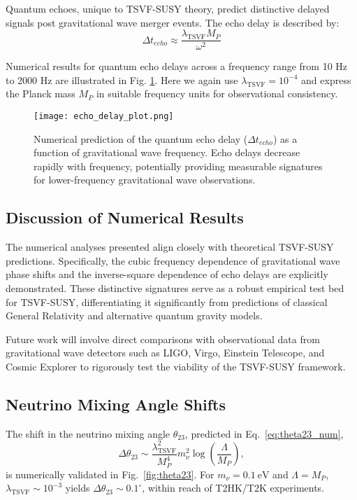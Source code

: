 \documentclass[12pt, onecolumn]{article}
\theoremstyle{definition}
\newcommand{\tsvf}{\lambda_{\mathrm{TSVF}}}
\numberwithin{equation}{section}
\begin{document}
Quantum echoes, unique to TSVF-SUSY theory, predict distinctive delayed signals post gravitational wave merger events. The echo delay is described by:
\begin{equation}\label{eq:echo_delay}
\Delta t_{echo} \approx \frac{\lambda_{\text{TSVF}} M_P}{\omega^2}
\end{equation}

Numerical results for quantum echo delays across a frequency range from 10 Hz to 2000 Hz are illustrated in Fig. \ref{fig:echo_delay}. Here we again use $\lambda_{\text{TSVF}} = 10^{-4}$ and express the Planck mass $M_P$ in suitable frequency units for observational consistency.

\begin{figure}[htbp]
\centering
\texttt{[image: echo\_delay\_plot.png]}
\caption{Numerical prediction of the quantum echo delay ($\Delta t_{echo}$) as a function of gravitational wave frequency. Echo delays decrease rapidly with frequency, potentially providing measurable signatures for lower-frequency gravitational wave observations.}
\label{fig:echo_delay}
\end{figure}

\subsection{Discussion of Numerical Results}\label{subsec:discussion_results}

The numerical analyses presented align closely with theoretical TSVF-SUSY predictions. Specifically, the cubic frequency dependence of gravitational wave phase shifts and the inverse-square dependence of echo delays are explicitly demonstrated. These distinctive signatures serve as a robust empirical test bed for TSVF-SUSY, differentiating it significantly from predictions of classical General Relativity and alternative quantum gravity models.

Future work will involve direct comparisons with observational data from gravitational wave detectors such as LIGO, Virgo, Einstein Telescope, and Cosmic Explorer to rigorously test the viability of the TSVF-SUSY framework.

\subsection{Neutrino Mixing Angle Shifts}  
\label{subsec:nu_sim}  

The shift in the neutrino mixing angle \(\theta_{23}\), predicted in Eq.~\eqref{eq:theta23_num},  
\begin{equation}
\Delta\theta_{23} \sim \frac{\tsvf^2}{M_P^4} m_\nu^2 \log\left(\frac{\Lambda}{M_P}\right),  
\label{eq:theta23_num}  
\end{equation}  
is numerically validated in Fig.~\ref{fig:theta23}. For \(m_\nu = 0.1~\mathrm{eV}\) and \(\Lambda = M_P\), \(\tsvf \sim 10^{-3}\) yields \(\Delta\theta_{23} \sim 0.1^\circ\), within reach of T2HK/T2K experiments.  
\end{document}
